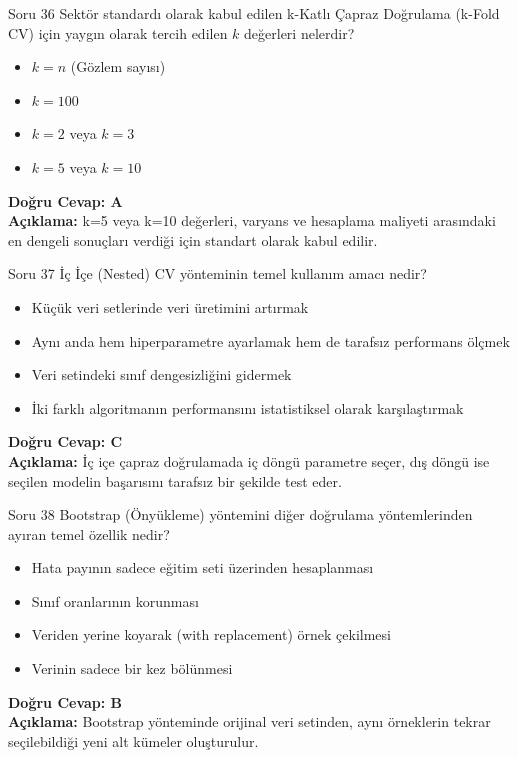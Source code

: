 \documentclass[12pt,a4paper]{article}
\begin{document}
\begin{testcard}{Soru 36}
    Sektör standardı olarak kabul edilen k-Katlı Çapraz Doğrulama (k-Fold CV) için yaygın olarak tercih edilen $k$ değerleri nelerdir?
    \begin{itemize}
        \item[A)] $k = n$ (Gözlem sayısı)
        \item[B)] $k = 100$
        \item[C)] $k = 2$ veya $k = 3$
        \item[D)] $k = 5$ veya $k = 10$
    \end{itemize}
    \tcblower
    \textbf{Doğru Cevap: A} \\
    \textbf{Açıklama:} k=5 veya k=10 değerleri, varyans ve hesaplama maliyeti arasındaki en dengeli sonuçları verdiği için standart olarak kabul edilir.
\end{testcard}

\begin{testcard}{Soru 37}
    İç İçe (Nested) CV yönteminin temel kullanım amacı nedir?
    \begin{itemize}
        \item[A)] Küçük veri setlerinde veri üretimini artırmak
        \item[B)] Aynı anda hem hiperparametre ayarlamak hem de tarafsız performans ölçmek
        \item[C)] Veri setindeki sınıf dengesizliğini gidermek
        \item[D)] İki farklı algoritmanın performansını istatistiksel olarak karşılaştırmak
    \end{itemize}
    \tcblower
    \textbf{Doğru Cevap: C} \\
    \textbf{Açıklama:} İç içe çapraz doğrulamada iç döngü parametre seçer, dış döngü ise seçilen modelin başarısını tarafsız bir şekilde test eder.
\end{testcard}

\begin{testcard}{Soru 38}
    Bootstrap (Önyükleme) yöntemini diğer doğrulama yöntemlerinden ayıran temel özellik nedir?
    \begin{itemize}
        \item[A)] Hata payının sadece eğitim seti üzerinden hesaplanması
        \item[B)] Sınıf oranlarının korunması
        \item[C)] Veriden yerine koyarak (with replacement) örnek çekilmesi
        \item[D)] Verinin sadece bir kez bölünmesi
    \end{itemize}
    \tcblower
    \textbf{Doğru Cevap: B} \\
    \textbf{Açıklama:} Bootstrap yönteminde orijinal veri setinden, aynı örneklerin tekrar seçilebildiği yeni alt kümeler oluşturulur.
\end{testcard}
\end{document}

